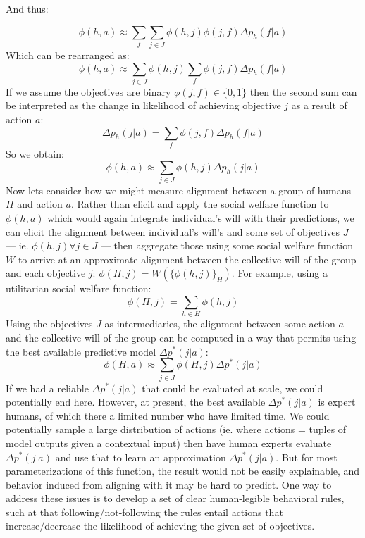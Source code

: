 \documentclass{article}
\begin{document}
And thus:

\begin{equation}
    \phi(h,a) \approx \sum \limits_{f}\sum\limits_{j\in J}\phi(h,j)\phi(j,f)\Delta p_h(f|a) 
\end{equation}
Which can be rearranged as:
\begin{equation}
    \phi(h,a) \approx \sum\limits_{j\in J}\phi(h,j) \sum\limits_{f}\phi(j,f)\Delta p_h(f|a) 
\end{equation}
If we assume the objectives are binary $\phi(j,f)\in\{0,1\}$ then the second sum can be interpreted as the change in likelihood of achieving objective $j$ as a result of action $a$: 
\begin{equation}
    \Delta p_h(j|a) = \sum\limits_{f}\phi(j,f)\Delta p_h(f|a) 
\end{equation}
So we obtain:
\begin{equation}
    \phi(h,a) \approx \sum\limits_{j\in J}\phi(h,j) \Delta p_h(j|a)
\end{equation}
Now lets consider how we might measure alignment between a group of humans $H$ and action $a$. Rather than elicit and apply the social welfare function to $\phi(h,a)$ which would again integrate individual's will with their predictions, we can elicit the alignment between individual's will's and some set of objectives $J$ --- ie. $\phi(h,j)\forall j\in J$ --- then aggregate those using some social welfare function $W$ to arrive at an approximate alignment between the collective will of the group and each objective $j$: $\phi(H,j) = W(\{\phi(h,j)\}_H)$. For example, using a utilitarian social welfare function:
\begin{equation}
    \phi(H,j) = \sum \limits_{h\in H}\phi(h,j)
\end{equation}
Using the objectives $J$ as intermediaries, the alignment between some action $a$ and the collective will of the group can be computed in a way that permits using the best available predictive model $\Delta p^*(j|a)$:
\begin{equation}
    \phi(H,a) \approx \sum\limits_{j\in J}\phi(H,j) \Delta p^*(j|a)
\end{equation}
If we had a reliable $\Delta p^*(j|a)$ that could be evaluated at scale, we could potentially end here. However, at present, the best available $\Delta p^*(j|a)$ is expert humans, of which there a limited number who have limited time. We could potentially sample a large distribution of actions (ie. where actions = tuples of model outputs given a contextual input) then have human experts evaluate $\Delta p^*(j|a)$ and use that to learn an approximation $\Delta p^*(j|a)$. But for most parameterizations of this function, the result would not be easily explainable, and behavior induced from aligning with it may be hard to predict. One way to address these issues is to develop a set of clear human-legible behavioral rules, such at that following/not-following the rules entail actions that increase/decrease the likelihood of achieving the given set of objectives. 
\end{document}
